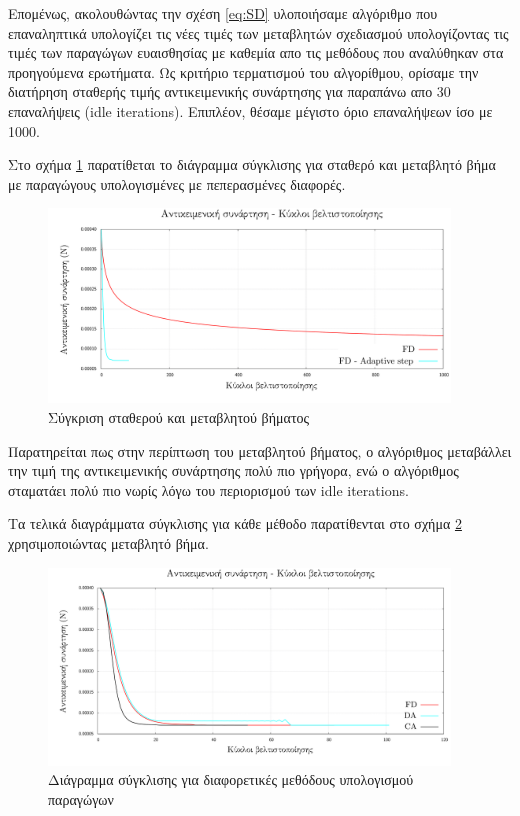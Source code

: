 Επομένως, ακολουθώντας την σχέση \ref{eq:SD} υλοποιήσαμε αλγόριθμο που επαναληπτικά υπολογίζει τις νέες τιμές των μεταβλητών σχεδιασμού υπολογίζοντας τις τιμές των παραγώγων ευαισθησίας με καθεμία απο τις μεθόδους που αναλύθηκαν στα προηγούμενα ερωτήματα. Ως κριτήριο τερματισμού του αλγορίθμου, ορίσαμε την διατήρηση σταθερής τιμής αντικειμενικής συνάρτησης για παραπάνω απο 30 επαναλήψεις (idle iterations). Επιπλέον, θέσαμε μέγιστο όριο επαναλήψεων ίσο με 1000. 

Στο σχήμα \ref{fig:adapt} παρατίθεται το διάγραμμα σύγκλισης για σταθερό και μεταβλητό βήμα με παραγώγους υπολογισμένες με πεπερασμένες διαφορές.   

\begin{figure}[h!]
    \begin{center}
        \includegraphics[width=0.95\textwidth]{figures/F_vs_adapt.pdf}
    \end{center}
    \caption{Σύγκριση σταθερού και μεταβλητού βήματος}
    \label{fig:adapt}
\end{figure}

Παρατηρείται πως στην περίπτωση του μεταβλητού βήματος, ο αλγόριθμος μεταβάλλει την τιμή της αντικειμενικής συνάρτησης πολύ πιο γρήγορα, ενώ ο αλγόριθμος σταματάει πολύ πιο νωρίς λόγω του περιορισμού των idle iterations.


Τα τελικά διαγράμματα σύγκλισης για κάθε μέθοδο παρατίθενται στο σχήμα \ref{fig:opt} χρησιμοποιώντας μεταβλητό βήμα. 


\begin{figure}[h!]
    \begin{center}
        \includegraphics[width=0.95\textwidth]{figures/F_vs_iter.pdf}
    \end{center}
    \caption{Διάγραμμα σύγκλισης για διαφορετικές μεθόδους υπολογισμού παραγώγων}
    \label{fig:opt}
\end{figure}



